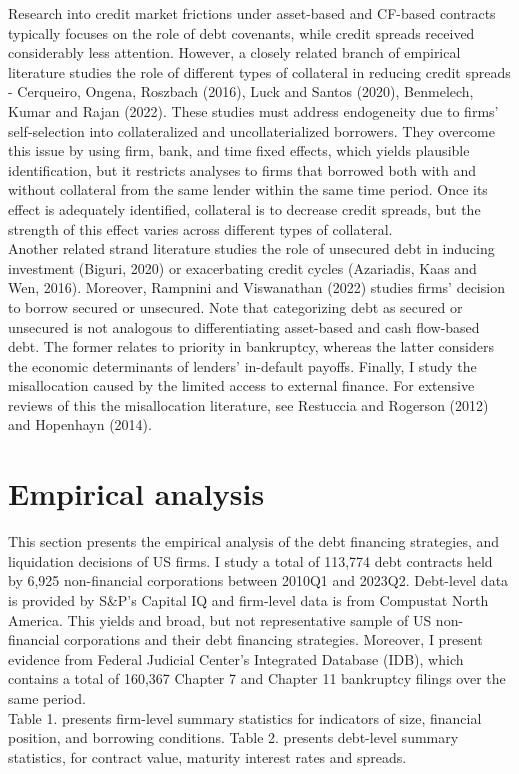 \documentclass[12pt]{article}
\begin{document}
Research into credit market frictions under asset-based and CF-based contracts typically focuses on the role of debt covenants, while credit spreads received considerably less attention. However, a closely related branch of empirical literature studies the role of different types of collateral in reducing credit spreads -  Cerqueiro, Ongena, Roszbach (2016), Luck and Santos (2020), Benmelech, Kumar and Rajan (2022). These studies must address endogeneity due to firms' self-selection into collateralized and uncollaterialized borrowers. They overcome this issue by using firm, bank, and time fixed effects, which yields plausible identification, but it restricts analyses to firms that borrowed both with and without collateral from the same lender within the same time period. Once its effect is adequately identified, collateral is to decrease credit spreads, but the strength of this effect varies across different types of collateral. \vspace{3mm} \\
Another related strand literature studies the role of unsecured debt in inducing investment (Biguri, 2020) or exacerbating credit cycles (Azariadis, Kaas and Wen, 2016). Moreover, Rampnini and Viswanathan (2022) studies firms' decision to borrow secured or unsecured. Note that categorizing debt as secured or unsecured is not analogous to differentiating asset-based and cash flow-based debt. The former relates to priority in bankruptcy, whereas the latter considers the economic determinants of lenders' in-default payoffs. Finally, I study the misallocation caused by the limited access to external finance. For extensive reviews of this the misallocation literature, see Restuccia and Rogerson (2012) and Hopenhayn (2014).

\section{Empirical analysis \label{sec:empirical analysis}}
This section presents the empirical analysis of the debt financing strategies, and liquidation decisions of US firms. I study a total of 113,774 debt contracts held by 6,925 non-financial corporations between 2010Q1 and 2023Q2. Debt-level data is provided by S\&P's Capital IQ and firm-level data is from Compustat North America. This yields and broad, but not representative sample of US non-financial corporations and their debt financing strategies. Moreover, I present evidence from Federal Judicial Center's Integrated Database (IDB), which contains a total of 160,367 Chapter 7 and Chapter 11 bankruptcy filings over the same period. \vspace{3mm} \\
Table 1. presents firm-level summary statistics for indicators of size, financial position, and borrowing conditions. Table 2. presents debt-level summary statistics, for contract value, maturity interest rates and spreads. 
\end{document}
